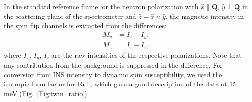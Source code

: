 \documentclass[twocolumn,prb,aps,showpacs]{revtex4-1}
\begin{document}
\vspace{10 pt}
\noindent
In the standard reference frame for the neutron polarization with $\hat{x}\parallel\mathbf{Q}$, $\hat{y}\perp\mathbf{Q}$ in the scattering plane of the spectrometer and $\hat{z}=\hat{x}\times\hat{y}$, the magnetic intensity in the spin flip channels is extracted from the differences:
%
%
\begin{align}
  M_{y} &= I_x - I_y, \\ \nonumber
  M_{z} &= I_x - I_z,
\end{align}
where $I_x$, $I_y$, $I_z$ are the raw intensities of the respective polarizations. Note that any contribution from the background is suppressed in the difference. For conversion from INS intensity to dynamic spin susceptibility, we used the isotropic form factor for Ru$^+$, which gave a good description of the data at 15 meV (Fig.~\ref{Fig:twin_ratio}). %
\end{document}
